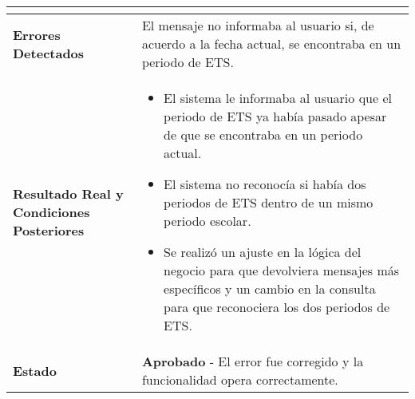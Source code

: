 \begin{longtable}{|p{5cm}|p{10cm}|}
\begin{itemize}
	\end{itemize}
	\\
	\hline
	\textbf{Errores Detectados} & 
	El mensaje no informaba al usuario si, de acuerdo a la fecha actual, se encontraba en un periodo de ETS. \\
	\hline
	\textbf{Resultado Real y Condiciones Posteriores} & 
	\begin{itemize}
		\item El sistema le informaba al usuario que el periodo de ETS ya había pasado apesar de que se encontraba en un periodo actual.
		\item El sistema no reconocía si había dos periodos de ETS dentro de un mismo periodo escolar.
		\item Se realizó un ajuste en la lógica del negocio para que devolviera mensajes más específicos y un cambio en la consulta para que reconociera los dos periodos de ETS.
	\end{itemize} \\
	\hline
	\textbf{Estado} & 
	\textbf{Aprobado} - El error fue corregido y la funcionalidad opera correctamente.   \\
	\hline
\end{longtable}